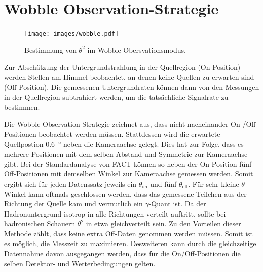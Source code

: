 \section{Wobble Observation-Strategie}
\begin{figure}
  \texttt{[image: images/wobble.pdf]}
  \caption{Bestimmung von $\theta^{2}$ im Wobble Obersvationsmodus.}
\end{figure}
Zur Abschätzung der Untergrundstrahlung in der Quellregion (On-Position) werden Stellen am Himmel beobachtet, an denen keine Quellen zu erwarten sind (Off-Position).
Die gemessenen Untergrundraten können dann von den Messungen in der Quellregion subtrahiert werden, um die tatsächliche Signalrate zu bestimmen.

Die Wobble Observation-Strategie zeichnet aus, dass nicht nacheinander On-/Off-Positionen beobachtet werden müssen. 
Stattdessen wird die erwartete Quellpostion \SI{0.6}{\degree} neben die Kameraachse gelegt. 
Dies hat zur Folge, dass es mehrere Positionen mit dem selben Abstand und Symmetrie zur Kameraachse gibt. 
Bei der Standardanalyse von FACT können so neben der On-Position fünf Off-Positionen mit demselben Winkel zur Kameraachse gemessen werden. 
Somit ergibt sich für jeden Datenssatz jeweils ein $\theta_\text{on}$ und fünf $\theta_\text{off}$. 
Für sehr kleine $\theta$ Winkel kann oftmals geschlossen werden, dass das gemessene Teilchen aus der Richtung der Quelle kam und vermutlich ein $\gamma$-Quant ist. 
Da der Hadronuntergrund isotrop in alle Richtungen verteilt auftritt, sollte bei hadronischen Schauern $\theta^{2}$ in etwa gleichverteilt sein. 
Zu den Vorteilen dieser Methode zählt, dass keine extra Off-Daten genommen werden müssen. 
Somit ist es möglich, die Messzeit zu maximieren. 
Desweiteren kann durch die gleichzeitige Datennahme davon ausgegangen werden, dass für die On/Off-Positionen die selben Detektor- und Wetterbedingungen gelten. 

